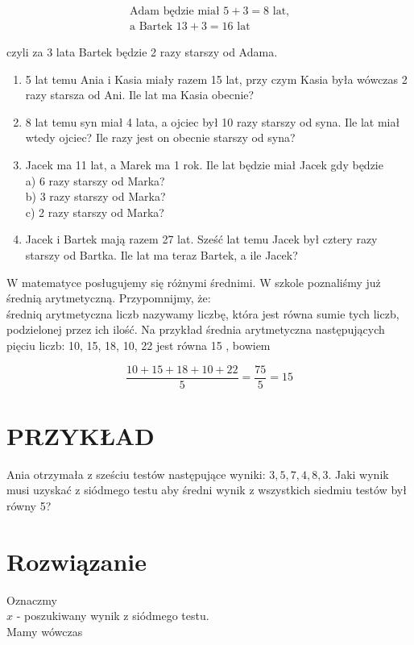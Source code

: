 \documentclass[10pt]{article}
\begin{document}
\[
\begin{gathered}
\text { Adam będzie miał } 5+3=8 \text { lat, } \\
\text { a Bartek } 13+3=16 \text { lat }
\end{gathered}
\]

czyli za 3 lata Bartek będzie 2 razy starszy od Adama.

\begin{enumerate}
  \item 5 lat temu Ania i Kasia miały razem 15 lat, przy czym Kasia była wówczas 2 razy starsza od Ani. Ile lat ma Kasia obecnie?
  \item 8 lat temu syn miał 4 lata, a ojciec był 10 razy starszy od syna. Ile lat miał wtedy ojciec? Ile razy jest on obecnie starszy od syna?
  \item Jacek ma 11 lat, a Marek ma 1 rok. Ile lat będzie miał Jacek gdy będzie\\
a) 6 razy starszy od Marka?\\
b) 3 razy starszy od Marka?\\
c) 2 razy starszy od Marka?
  \item Jacek i Bartek mają razem 27 lat. Sześć lat temu Jacek był cztery razy starszy od Bartka. Ile lat ma teraz Bartek, a ile Jacek?
\end{enumerate}

W matematyce posługujemy się różnymi średnimi. W szkole poznaliśmy już średnią arytmetyczną. Przypomnijmy, że:\\
średniq arytmetyczna liczb nazywamy liczbę, która jest równa sumie tych liczb, podzielonej przez ich ilość. Na przykład średnia arytmetyczna następujących pięciu liczb: 10, 15, 18, 10, 22 jest równa 15 , bowiem

\[
\frac{10+15+18+10+22}{5}=\frac{75}{5}=15
\]

\section*{PRZYKŁAD}
Ania otrzymała z sześciu testów następujące wyniki: \(3,5,7,4,8,3\). Jaki wynik musi uzyskać z siódmego testu aby średni wynik z wszystkich siedmiu testów był równy 5?

\section*{Rozwiązanie}
Oznaczmy\\
\(x\) - poszukiwany wynik z siódmego testu.\\
Mamy wówczas
\end{document}
